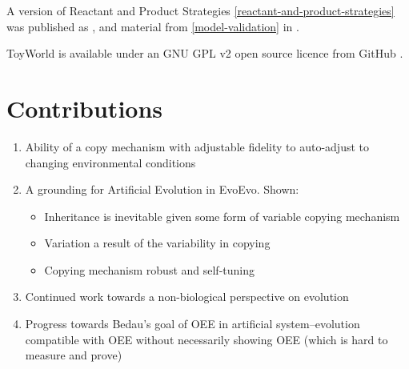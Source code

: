 A version of Reactant and Product Strategies \cref{reactant-and-product-strategies} was published as \cite{Young2015},
and material from \cref{model-validation} in \cite{Young2013}.

ToyWorld is available under an GNU GPL v2 open source licence from GitHub \cite{toyworld}.

\section{Contributions}\label{contributions}

\begin{enumerate}
	\item Ability of a copy mechanism with adjustable fidelity to auto-adjust to changing environmental conditions
	\item A grounding for Artificial Evolution in EvoEvo. Shown:
	      \begin{itemize}
	      	\item Inheritance is inevitable given some form of variable copying mechanism
	      	\item Variation a result of the variability in copying
	      	\item Copying mechanism robust and self-tuning
	      \end{itemize}
	\item Continued work towards a non-biological perspective on evolution
	\item Progress towards Bedau's goal of OEE in artificial system--evolution compatible with OEE without necessarily showing OEE (which is hard to measure and prove)
\end{enumerate}